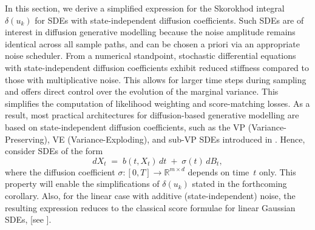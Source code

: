 \documentclass[]{interact}
\newcommand{\1}{\mathbf{1}}
\theoremstyle{plain}%
\theoremstyle{definition}
\theoremstyle{remark}
\numberwithin{equation}{section}
\begin{document}
In this section, we derive a simplified expression for the Skorokhod integral $\delta(u_k)$ for SDEs with state-independent diffusion coefficients. 
%
Such SDEs are of interest in diffusion generative modelling because the noise amplitude remains identical across all sample paths, and can be chosen a priori via an appropriate noise scheduler. From a numerical standpoint, stochastic differential equations with state-independent diffusion coefficients exhibit reduced stiffness compared to those with multiplicative noise. This allows for larger time steps during sampling and offers direct control over the evolution of the marginal variance. This simplifies the computation of likelihood weighting and score-matching losses. As a result, most practical architectures for diffusion-based generative modelling are based on state-independent diffusion coefficients, such as the VP (Variance-Preserving), VE (Variance-Exploding), and sub-VP SDEs introduced in \cite{song2021scorebased}. Hence, consider SDEs of the form
\[
  dX_t \;=\; b(t,X_t)\,dt \;+\; \sigma(t)\,dB_t,
\]
where the diffusion coefficient $\sigma:[0,T]\to\mathbb{R}^{m\times d}$ depends on time~$t$ only. This property will enable the simplifications of $\delta(u_k)$ stated in the forthcoming corollary.
Also, for the linear case with additive (state-independent) noise, the resulting expression reduces to the classical score formulae for linear Gaussian SDEs, [see \cite{mirafzali2025malliavincalculusscorebaseddiffusion}].
\end{document}
